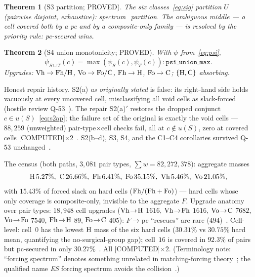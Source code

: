 \documentclass[11pt,a4paper]{article}
\newtheorem{theorem}{Theorem}
\theoremstyle{definition}
\newcommand{\cH}{\textnormal{H}}
\newcommand{\cC}{\textnormal{C}}
\newcommand{\cFh}{\textnormal{Fh}}
\newcommand{\cFo}{\textnormal{Fo}}
\newcommand{\cVh}{\textnormal{Vh}}
\newcommand{\cVo}{\textnormal{Vo}}
\begin{document}
\begin{theorem}[S3 partition; PROVED]
  \label{thm:s3}
  The six classes~\eqref{eq:sig} partition $U$ (pairwise disjoint,
  exhaustive): \url{spectrum_partition}.  The ambiguous middle --- a
  cell covered both by a pc and by a composite-only family --- is resolved
  by the priority rule: pc-secured wins.
\end{theorem}

\begin{theorem}[S4 union monotonicity; PROVED]
  \label{thm:s4}
  With $\psi$ from~\eqref{eq:psi},
  \begin{equation}
    \label{eq:s4}
    \psi_{S\cup T}(c)=\max(\psi_S(c),\psi_T(c)):
    \texttt{psi\_union\_max}.
  \end{equation}
  Upgrades: $\cVh\to\cFh/\cH$, $\cVo\to\cFo/\cC$, $\cFh\to\cH$,
  $\cFo\to\cC$; $\{\cH,\cC\}$ absorbing.
\end{theorem}

Honest repair history.  S2(a) \emph{as originally stated} is false: its
right-hand side holds vacuously at every uncovered cell, misclassifying all
void cells as slack-forced (hostile review Q-53~\cite{D316}).  The repair
S2(a)$'$ restores the dropped conjunct $c\in u(S)$~\eqref{eq:s2ap}; the
failure set of the original is exactly the void cells --- $88{,}259$
(unweighted) pair-type$\times$cell checks fail, all at $c\notin u(S)$, zero
at covered cells [COMPUTED]$\times2$~\cite{D316}.  S2(b--d), S3, S4, and the
C1--C4 corollaries survived Q-53 unchanged~\cite{D316}.

The census (both paths, $3{,}081$ pair types, $\sum w=82{,}272{,}378$):
aggregate masses
\begin{equation}
  \label{eq:masses}
  \cH\,5.27\%,\ \cC\,26.66\%,\ \cFh\,6.41\%,\ \cFo\,35.15\%,\
  \cVh\,5.46\%,\ \cVo\,21.05\%,
\end{equation}
with $15.43\%$ of forced slack on hard cells ($\cFh/(\cFh+\cFo)$) --- hard
cells whose only coverage is composite-only, invisible to the aggregate $F$.
Upgrade anatomy over pair types: $18{,}948$ cell upgrades
($\cVh\!\to\!\cH$ $1616$, $\cVh\!\to\!\cFh$ $1616$, $\cVo\!\to\!\cC$ $7682$,
$\cVo\!\to\!\cFo$ $7540$, $\cFh\!\to\!\cH$ $89$, $\cFo\!\to\!\cC$ $405$):
$F\!\to\!$pc ``rescues'' are rare ($494$)~\cite{D313,D316}.  Cell-level:
cell~$0$ has the lowest $\cH$ mass of the six hard cells ($30.31\%$ vs
$30.75\%$ hard mean, quantifying the no-surgical-group gap); cell~$16$ is
covered in $92.3\%$ of pairs but pc-secured in only $30.27\%$~\cite{D313,D316}.
All [COMPUTED]$\times2$.  (Terminology note: ``forcing spectrum'' denotes
something unrelated in matching-forcing theory~\cite{AMM04}; the qualified
name \emph{ES} forcing spectrum avoids the collision~\cite{D313}.)
\end{document}
